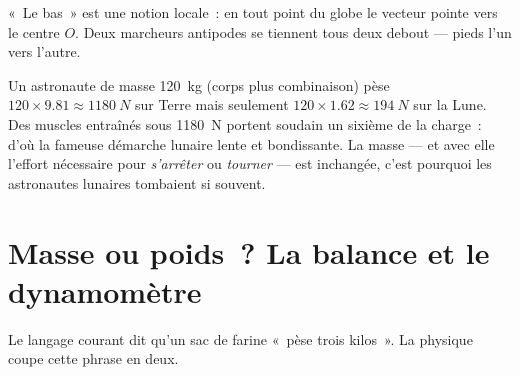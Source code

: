 \begin{omfigure}

{\small «~Le bas~» est une notion locale~: en tout point du globe le
vecteur  pointe vers le centre $O$. Deux marcheurs
antipodes se tiennent tous deux debout --- pieds l'un vers l'autre.}
\end{omfigure}

\begin{remark}\label{rem:g10:universal-gravitation:bounce}
Un astronaute de masse \qty{120}{kg} (corps plus combinaison) pèse
$120 \times 9.81 \approx \qty{1180}{N}$ sur Terre mais seulement
$120 \times 1.62 \approx \qty{194}{N}$ sur la Lune. Des muscles
entraînés sous \qty{1180}{N} portent soudain un sixième de la charge~:
d'où la fameuse démarche lunaire lente et bondissante. La masse --- et
avec elle l'effort nécessaire pour \emph{s'arrêter} ou \emph{tourner}
--- est inchangée, c'est pourquoi les astronautes lunaires tombaient si
souvent.
\end{remark}

\section{Masse ou poids~? La balance et le dynamomètre}

Le langage courant dit qu'un sac de farine «~pèse trois kilos~». La
physique coupe cette phrase en deux.

